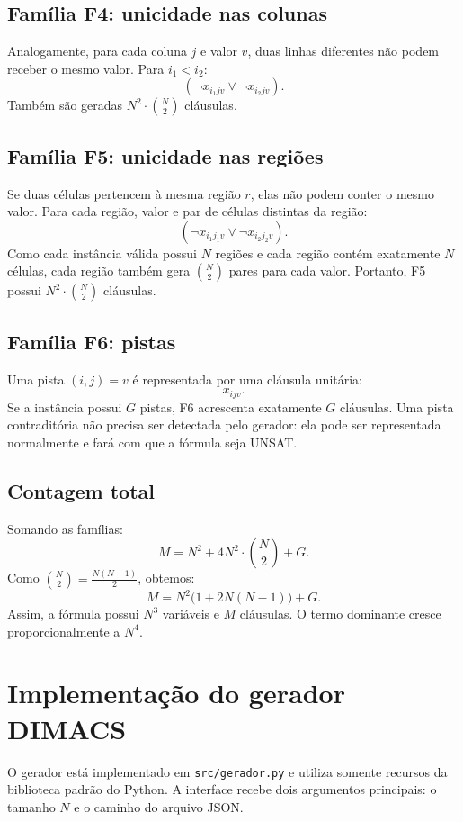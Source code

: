 \documentclass[a4paper, 12pt]{article}
\begin{document}
\subsection{Família F4: unicidade nas colunas}

Analogamente, para cada coluna \(j\) e valor \(v\), duas linhas diferentes não podem receber o mesmo valor. Para \(i_1 < i_2\):
\[
(\neg x_{i_1jv} \lor \neg x_{i_2jv}).
\]
Também são geradas \(N^2 \cdot \binom{N}{2}\) cláusulas.

\subsection{Família F5: unicidade nas regiões}

Se duas células pertencem à mesma região \(r\), elas não podem conter o mesmo valor. Para cada região, valor e par de células distintas da região:
\[
(\neg x_{i_1j_1v} \lor \neg x_{i_2j_2v}).
\]
Como cada instância válida possui \(N\) regiões e cada região contém exatamente \(N\) células, cada região também gera \(\binom{N}{2}\) pares para cada valor. Portanto, F5 possui \(N^2 \cdot \binom{N}{2}\) cláusulas.

\subsection{Família F6: pistas}

Uma pista \((i,j)=v\) é representada por uma cláusula unitária:
\[
x_{ijv}.
\]
Se a instância possui \(G\) pistas, F6 acrescenta exatamente \(G\) cláusulas. Uma pista contraditória não precisa ser detectada pelo gerador: ela pode ser representada normalmente e fará com que a fórmula seja UNSAT.

\subsection{Contagem total}

Somando as famílias:
\[
M = N^2 + 4N^2 \cdot \binom{N}{2} + G.
\]
Como \(\binom{N}{2} = \frac{N(N-1)}{2}\), obtemos:
\[
M = N^2 \bigl(1 + 2N(N-1)\bigr) + G.
\]
Assim, a fórmula possui \(N^3\) variáveis e \(M\) cláusulas. O termo dominante cresce proporcionalmente a \(N^4\).

\section{Implementação do gerador DIMACS}

O gerador está implementado em \texttt{src/gerador.py} e utiliza somente recursos da biblioteca padrão do Python. A interface recebe dois argumentos principais: o tamanho \(N\) e o caminho do arquivo JSON.
\end{document}
